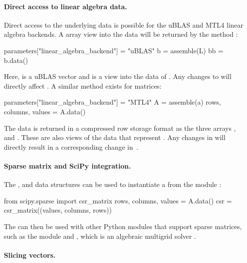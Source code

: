 
\paragraph{Direct access to linear algebra data.}

Direct access to the underlying data is possible for the uBLAS
and MTL4 linear algebra backends. A \numpy array view into the
data will be returned by the method :
\begin{python}
parameters["linear_algebra_backend"] = "uBLAS"
b = assemble(L)
bb = b.data()
\end{python}
Here,  is a uBLAS vector and  is a \numpy view
into the data of . Any changes to  will directly affect
. A similar method exists for matrices:
\begin{python}
parameters["linear_algebra_backend"] = "MTL4"
A = assemble(a)
rows, columns, values = A.data()
\end{python}
The data is returned in a compressed row storage format as the three
\numpy arrays ,  and . These are also
views of the data that represent . Any changes in 
will directly result in a corresponding change in~.

\paragraph{Sparse matrix and SciPy integration.}

The ,  and  data structures can
be used to instantiate a  from the 
module \citep{JonesOliphantPetersonEtAl2009}:
\begin{python}
from scipy.sparse import csr_matrix
rows, columns, values = A.data()
csr = csr_matrix((values, columns, rows))
\end{python}
The  can then be used with other Python modules
that support sparse matrices, such as the 
module and , which is an algebraic multigrid solver
\citep{BellOlsonSchroder2009}.

\paragraph{Slicing vectors.}

